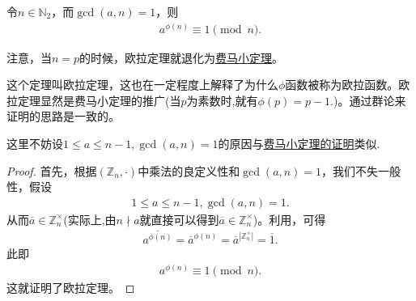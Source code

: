 \documentclass[../../main.tex]{subfiles}
\begin{document}
\begin{theorem}[Euler定理]\label{theorem:Euler定理}
令$n \in \mathbb{N}_2$，而$\gcd(a, n) = 1$，则
\begin{align*}
a^{\phi(n)} \equiv 1 \pmod{n}.
\end{align*}
\end{theorem}
\begin{remark}
注意，当$n = p$的时候，欧拉定理就退化为\hyperref[theorem:Fermat小定理]{费马小定理}。 
\end{remark}
\begin{note}
这个定理叫欧拉定理，这也在一定程度上解释了为什么$\phi$函数被称为欧拉函数。欧拉定理显然是费马小定理的推广(当$p$为素数时,就有$\phi (p)=p-1.$)。通过群论来证明的思路是一致的。
\end{note}
\begin{remark}
这里不妨设$1 \leqslant a \leqslant n - 1, \gcd(a, n) = 1 $的原因与\hyperref[theorem:Fermat小定理]{费马小定理的证明}类似.
\end{remark}
\begin{proof}
首先，根据$(\mathbb{Z}_n, \cdot)$中乘法的良定义性和$\gcd(a, n) = 1$，我们不失一般性，假设
\begin{align*}
1 \leqslant a \leqslant n - 1, \gcd(a, n) = 1 .
\end{align*}
从而$\overline{a} \in \mathbb{Z}_n^\times$(实际上,由$n \nmid a$就直接可以得到$\overline{a} \in \mathbb{Z}_n^\times$)。利用，可得
\begin{align*}
\overline{a^{\phi(n)}}=\overline{a}^{\phi(n)}=\overline{a}^{|\mathbb{Z}_n^\times|} = \overline{1} .
\end{align*}
此即
\begin{align*}
a^{\phi(n)} \equiv 1 \pmod{n} .
\end{align*}
这就证明了欧拉定理。

\end{proof}
\end{document}

